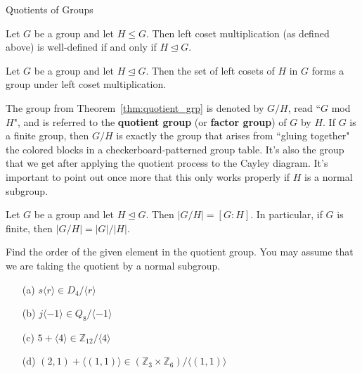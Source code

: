 \begin{section}{Quotients of Groups}
\begin{theorem}
Let $G$ be a group and let $H\leq G$.  Then left coset multiplication (as defined above) is well-defined if and only if $H\trianglelefteq G$.
\end{theorem}

\begin{theorem}\label{thm:quotient_grp}
Let $G$ be a group and let $H\trianglelefteq G$.  Then the set of left cosets of $H$ in $G$ forms a group under left coset multiplication.
\end{theorem}

The group from Theorem~\ref{thm:quotient_grp} is denoted by $G/H$, read ``$G$ mod $H$", and is referred to the \textbf{quotient group} (or \textbf{factor group}) of $G$ by $H$.  If $G$ is a finite group, then $G/H$ is exactly the group that arises from ``gluing together" the colored blocks in a checkerboard-patterned group table.  It's also the group that we get after applying the quotient process to the Cayley diagram.  It's important to point out once more that this only works properly if $H$ is a normal subgroup.

\begin{theorem}
Let $G$ be a group and let $H\trianglelefteq G$.  Then $|G/H|=[G:H]$.  In particular, if $G$ is finite, then $|G/H|=|G|/|H|$.
\end{theorem}

\begin{exercise}%
Find the order of the given element in the quotient group. You may assume that we are taking the quotient by a normal subgroup. 
\begin{enumerate}
\item[(a)] $s\langle r\rangle \in D_4/\langle r\rangle$
\item[(b)] $j\langle -1\rangle \in Q_8/\langle -1\rangle$
\item[(c)] $5+\langle 4\rangle \in \mathbb{Z}_{12}/\langle 4\rangle$
\item[(d)] $(2,1)+\langle (1,1)\rangle \in (\mathbb{Z}_3\times \mathbb{Z}_6)/\langle (1,1)\rangle$ 
\end{enumerate}
 
\end{exercise}



\end{section}
